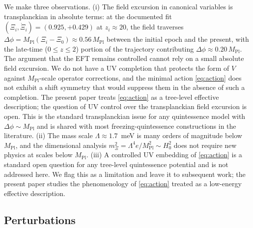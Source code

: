 \documentclass[11pt,reqno]{amsart}
\theoremstyle{plain}
\theoremstyle{definition}
\theoremstyle{remark}
\newcommand{\Pl}{\mathrm{Pl}}
\begin{document}
We make three observations. (i) The field excursion in canonical
variables is transplanckian in absolute terms: at the documented fit
$(\Xi_i, \dot\Xi_i) = (0.925, +0.429)$ at $z_i \approx 20$, the
field traverses $\Delta\phi = M_\Pl(\Xi_i - \Xi_0) \approx 0.56\,M_\Pl$
between the initial epoch and the present, with the late-time
($0 \le z \le 2$) portion of the trajectory contributing
$\Delta\phi \approx 0.20\,M_\Pl$. The argument that the
EFT remains controlled cannot rely on a small absolute field
excursion. We do not have a UV completion that protects the form
of $V$ against $M_\Pl$-scale operator corrections, and the minimal
action \eqref{eq:action} does not exhibit a shift symmetry that
would suppress them in the absence of such a completion. The
present paper treats \eqref{eq:action} as a tree-level effective
description; the question of UV control over the transplanckian
field excursion is open. This is the standard transplanckian
issue for any quintessence model with $\Delta\phi \sim M_\Pl$ and
is shared with most freezing-quintessence constructions in the
literature.
(ii) The mass scale $\Lambda \approx 1.7$~meV is many
orders of magnitude below $M_\Pl$, and the dimensional analysis
$m_\Xi^{2} = \Lambda^{4} e / M_\Pl^{2} \sim H_0^{2}$ does not require
new physics at scales below $M_\Pl$. (iii) A controlled UV embedding
of \eqref{eq:action} is a standard open question for any tree-level
quintessence potential and is not addressed here. We flag this as a
limitation and leave it to subsequent work; the present paper studies
the phenomenology of \eqref{eq:action} treated as a low-energy
effective description.

\subsection{Perturbations}\label{sec:perts}
\end{document}
